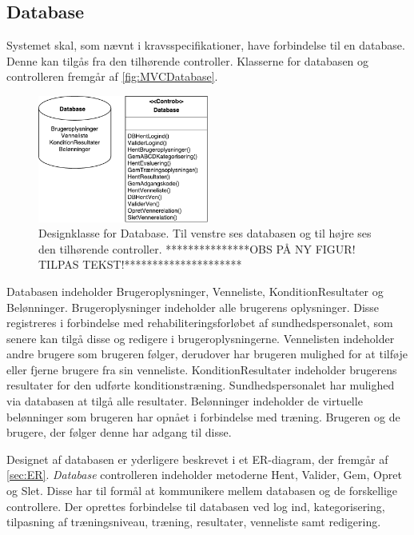 \subsection*{Database}
Systemet skal, som nævnt i kravsspecifikationer, have forbindelse til en database. Denne kan tilgås fra den tilhørende controller. Klasserne for databasen og controlleren fremgår af \autoref{fig:MVCDatabase}. 

\begin{figure} [H]
\centering
\includegraphics[width=0.5\textwidth]{figures/MVC/MVCDatabase}
\caption{Designklasse for Database. Til venstre ses databasen og til højre ses den tilhørende controller. ***************OBS PÅ NY FIGUR! TILPAS TEKST!*********************}
\label{fig:MVCDatabase}
\end{figure}

\noindent
Databasen indeholder Brugeroplysninger, Venneliste, KonditionResultater og Belønninger. Brugeroplysninger indeholder alle brugerens oplysninger. Disse registreres i forbindelse med rehabiliteringsforløbet af sundhedspersonalet, som senere kan tilgå disse og redigere i brugeroplysningerne. Vennelisten indeholder andre brugere som brugeren følger, derudover har brugeren mulighed for at tilføje eller fjerne brugere fra sin venneliste. KonditionResultater indeholder brugerens resultater for den udførte konditionstræning. Sundhedspersonalet har mulighed via databasen at tilgå alle resultater. Belønninger indeholder de virtuelle belønninger som brugeren har opnået i forbindelse med træning. Brugeren og de brugere, der følger denne har adgang til disse.  

Designet af databasen er yderligere beskrevet i et ER-diagram, der fremgår af \autoref{sec:ER}. \textit{Database} controlleren indeholder metoderne Hent, Valider, Gem, Opret og Slet. Disse har til formål at kommunikere mellem databasen og de forskellige controllere. Der oprettes forbindelse til databasen ved log ind, kategorisering, tilpasning af træningsniveau, træning, resultater, venneliste samt redigering. 

